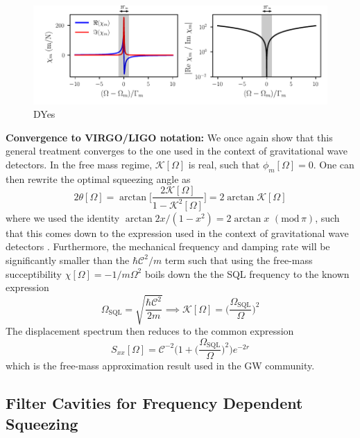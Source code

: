 \begin{figure}
  \centering
  \includegraphics[width=\textwidth]{./chap3/fig/chi_meca.pdf}
  \caption{DYes}
  \label{fig:freq_indep_squeezing}
\end{figure}

\noindent \textbf{Convergence to VIRGO/LIGO notation:} We once again show that this general treatment converges to the one used in the context of gravitational wave detectors. In the free mass regime, $\mathcal{K}[\Omega]$ is real, such that $\phi_m[\Omega]=0$. One can then rewrite the optimal squeezing angle as
\begin{equation}
  2 \theta[\Omega] = \arctan \Big[\dfrac{2\mathcal{K}[\Omega]}{1 - \mathcal{K}^2[\Omega]}\Big] = 2 \arctan \mathcal{K}[\Omega]
\end{equation}
where we used the identity $\arctan 2x/(1-x^2) = 2\arctan x \, \, (\text{mod}\, \pi)$, such that this comes down to the expression used in the context of gravitational wave detectors \cite{harry_advanced_2010, aasi_enhanced_2013}. Furthermore, the mechanical frequency and damping rate will be significantly smaller than the $\hbar \mathcal{C}^2/m$ term such that using the free-mass succeptibility $\chi[\Omega] = -1/m \Omega^2$ boils down the the SQL frequency to the known expression
\begin{equation}
  \Omega_{\text{SQL}} = \sqrt{\dfrac{\hbar \mathcal{C}^2}{2 m }} \implies \mathcal{K}[\Omega] = \Big( \dfrac{\Omega_{\text{SQL}}}{\Omega}\Big)^2
\end{equation}
The displacement spectrum then reduces to the common expression
\begin{equation}
  S_{xx}[\Omega] = \mathcal{C}^{-2} \Bigg( 1  + \Big( \dfrac{\Omega_{\text{SQL}}}{\Omega}\Big)^2 \Bigg)e^{-2r}
\end{equation}
which is the free-mass approximation result used in the GW community. 

\subsection{Filter Cavities for Frequency Dependent Squeezing}

